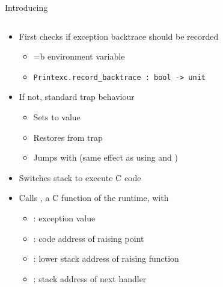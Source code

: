 \newcommand\listAmdSixtyFour[1][]{
  \listasm[firstline=702,lastline=725,#1]{../ocaml/runtime/amd64.S}{runtime/amd64.S}}
\begin{frame}{Introducing }
  \begin{columns}[c]
    \begin{column}{0.5\textwidth}
      \begin{itemize}
        \item<1-> First checks if exception backtrace should be recorded
          \begin{itemize}
            \item {}=b environment variable
            \item \texttt{Printexc.record_backtrace : bool -> unit} \footnotemark
          \end{itemize}
        \item<2-> If not, standard trap behaviour
          \begin{itemize}
            \item Sets  to  value
            \item Restores  from trap
            \item Jumps with  (same effect as using  and )
          \end{itemize}
        \item<3-> Switches stack to execute C code
        \item<4-> Calls , a C function of the runtime, with
          \begin{itemize}
            \item {}: exception value
            \item {}: code address of raising point
            \item {}: lower stack address of raising function
            \item {}: stack address of next handler
          \end{itemize}
      \end{itemize}
      \bigskip
    \end{column}
    \begin{column}{0.5\textwidth}
\end{column}
\end{columns}
\end{frame}

